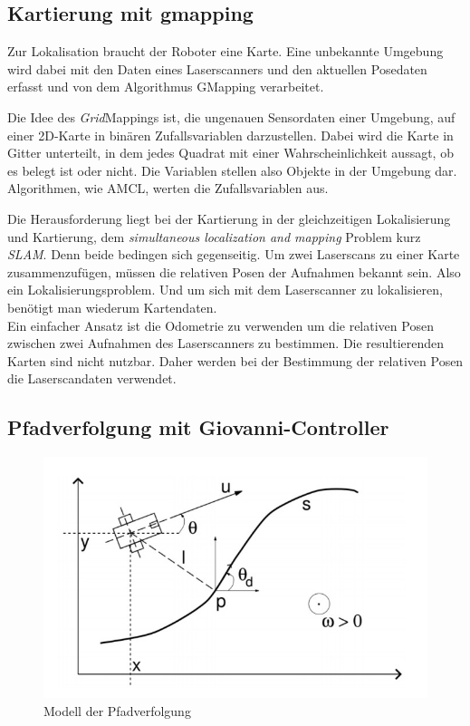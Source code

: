 \documentclass[11pt,a4paper]{article}
\begin{document}
\subsection{Kartierung mit gmapping  \cite{Gmapping}}
{
	Zur Lokalisation braucht der Roboter eine Karte. Eine unbekannte Umgebung wird dabei mit den Daten eines Laserscanners und den aktuellen Posedaten erfasst und von dem Algorithmus GMapping verarbeitet.
	
	Die Idee des  \textit{Grid}Mappings ist, die ungenauen Sensordaten einer Umgebung, auf einer 2D-Karte in bin\"aren Zufallsvariablen darzustellen. Dabei wird die Karte in Gitter unterteilt, in dem jedes Quadrat mit einer Wahrscheinlichkeit aussagt, ob es belegt ist oder nicht. Die Variablen stellen also Objekte in der Umgebung dar. Algorithmen, wie AMCL, werten die Zufallsvariablen aus.  
	
	Die Herausforderung liegt bei der Kartierung in der gleichzeitigen Lokalisierung und Kartierung, dem \textit{simultaneous localization and mapping} Problem kurz \textit{SLAM}. Denn beide bedingen sich gegenseitig. Um  zwei Laserscans zu einer Karte zusammenzuf\"ugen, m\"ussen die relativen Posen der Aufnahmen bekannt sein. Also ein Lokalisierungsproblem. Und um sich mit dem Laserscanner zu lokalisieren, ben\"otigt man wiederum Kartendaten. \\
    
    Ein einfacher Ansatz ist die Odometrie zu verwenden um die relativen Posen zwischen zwei Aufnahmen des Laserscanners zu bestimmen. Die resultierenden Karten sind nicht nutzbar. Daher werden bei der Bestimmung der relativen Posen die Laserscandaten verwendet. 

\subsection{Pfadverfolgung mit Giovanni-Controller}


\begin{figure}[h]
	\includegraphics[width=\linewidth]{pictures/Pfadverfolgung.JPG}
	\caption{Modell der Pfadverfolgung}
\end{figure}

}
\end{document}
